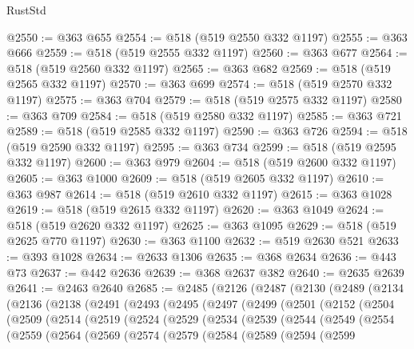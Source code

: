 \begin{lexlean}{RustStd}
\begin{coremodule}
{\begin{coremodule}
{{{{{{{{{{{{{{{{{{{{{{{{{{{{{{{{{{{{{{{{{{{{{{{{{{@2550 := @363 @655
@2554 := @518 (@519 @2550 @332 @1197)
@2555 := @363 @666
@2559 := @518 (@519 @2555 @332 @1197)
@2560 := @363 @677
@2564 := @518 (@519 @2560 @332 @1197)
@2565 := @363 @682
@2569 := @518 (@519 @2565 @332 @1197)
@2570 := @363 @699
@2574 := @518 (@519 @2570 @332 @1197)
@2575 := @363 @704
@2579 := @518 (@519 @2575 @332 @1197)
@2580 := @363 @709
@2584 := @518 (@519 @2580 @332 @1197)
@2585 := @363 @721
@2589 := @518 (@519 @2585 @332 @1197)
@2590 := @363 @726
@2594 := @518 (@519 @2590 @332 @1197)
@2595 := @363 @734
@2599 := @518 (@519 @2595 @332 @1197)
@2600 := @363 @979
@2604 := @518 (@519 @2600 @332 @1197)
@2605 := @363 @1000
@2609 := @518 (@519 @2605 @332 @1197)
@2610 := @363 @987
@2614 := @518 (@519 @2610 @332 @1197)
@2615 := @363 @1028
@2619 := @518 (@519 @2615 @332 @1197)
@2620 := @363 @1049
@2624 := @518 (@519 @2620 @332 @1197)
@2625 := @363 @1095
@2629 := @518 (@519 @2625 @770 @1197)
@2630 := @363 @1100
@2632 := @519 @2630 @521
@2633 := @393 @1028
@2634 := @2633 @1306
@2635 := @368 @2634
@2636 := @443 @73
@2637 := @442 @2636
@2639 := @368 @2637 @382
@2640 := @2635 @2639
@2641 := @2463 @2640
@2685 := @2485
    (@2126
      (@2487
        (@2130
          (@2489
            (@2134
              (@2136
                (@2138
                  (@2491
                    (@2493
                      (@2495
                        (@2497
                          (@2499
                            (@2501
                              (@2152
                                (@2504
                                  (@2509
                                    (@2514
                                      (@2519
                                        (@2524
                                          (@2529
                                            (@2534
                                              (@2539
                                                (@2544
                                                  (@2549
                                                    (@2554
                                                      (@2559
                                                        (@2564
                                                          (@2569
                                                            (@2574
                                                              (@2579
                                                                (@2584
                                                                  (@2589
                                                                    (@2594
                                                                      (@2599
}}}}}}}}}}}}}}}}}}}}}}}}}}}}}}}}}}}}}}}}}}}}}}}}}}
\end{coremodule}}
\end{coremodule}
\end{lexlean}
